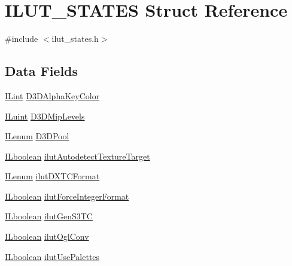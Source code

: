 \hypertarget{struct_i_l_u_t___s_t_a_t_e_s}{\section{I\-L\-U\-T\-\_\-\-S\-T\-A\-T\-E\-S Struct Reference}
\label{struct_i_l_u_t___s_t_a_t_e_s}
}


{\ttfamily \#include $<$ilut\-\_\-states.\-h$>$}

\subsection*{Data Fields}
\begin{DoxyCompactItemize}
\item 
\hyperlink{il_8h_a288a97fb9e92e707a60b749d0039fafe}{I\-Lint} \hyperlink{struct_i_l_u_t___s_t_a_t_e_s_ab1ef60136a5616f5de69309acd52b860}{D3\-D\-Alpha\-Key\-Color}
\item 
\hyperlink{il_8h_ac6508d0e9c19e32f32e00d54b5b8cf30}{I\-Luint} \hyperlink{struct_i_l_u_t___s_t_a_t_e_s_a51cd3ae4c36f252a49fbf0153edaa7c7}{D3\-D\-Mip\-Levels}
\item 
\hyperlink{il_8h_a1542f3a70c0c5370a30a1fa5ce349e2d}{I\-Lenum} \hyperlink{struct_i_l_u_t___s_t_a_t_e_s_ae5a832f5aa3ed51c4eedc71ce428ff6a}{D3\-D\-Pool}
\item 
\hyperlink{il_8h_a8be80d75c2c636b9f2250fe10c2e7874}{I\-Lboolean} \hyperlink{struct_i_l_u_t___s_t_a_t_e_s_a6bc8b024b3cdb6356e7c1197cb309217}{ilut\-Autodetect\-Texture\-Target}
\item 
\hyperlink{il_8h_a1542f3a70c0c5370a30a1fa5ce349e2d}{I\-Lenum} \hyperlink{struct_i_l_u_t___s_t_a_t_e_s_aa6be54e9464fd2dd9da744c94c821bd3}{ilut\-D\-X\-T\-C\-Format}
\item 
\hyperlink{il_8h_a8be80d75c2c636b9f2250fe10c2e7874}{I\-Lboolean} \hyperlink{struct_i_l_u_t___s_t_a_t_e_s_a96cd623632d0cdd4dc3fcde10f2b2d07}{ilut\-Force\-Integer\-Format}
\item 
\hyperlink{il_8h_a8be80d75c2c636b9f2250fe10c2e7874}{I\-Lboolean} \hyperlink{struct_i_l_u_t___s_t_a_t_e_s_a2439c6aa181c8b4759c015d732b9a2dc}{ilut\-Gen\-S3\-T\-C}
\item 
\hyperlink{il_8h_a8be80d75c2c636b9f2250fe10c2e7874}{I\-Lboolean} \hyperlink{struct_i_l_u_t___s_t_a_t_e_s_af51741fdac12f8ef0b3e9b9b7ff1c9d6}{ilut\-Ogl\-Conv}
\item 
\hyperlink{il_8h_a8be80d75c2c636b9f2250fe10c2e7874}{I\-Lboolean} \hyperlink{struct_i_l_u_t___s_t_a_t_e_s_ac71abb5cbd432cef194b3b3d000c4185}{ilut\-Use\-Palettes}

\end{DoxyCompactItemize}
